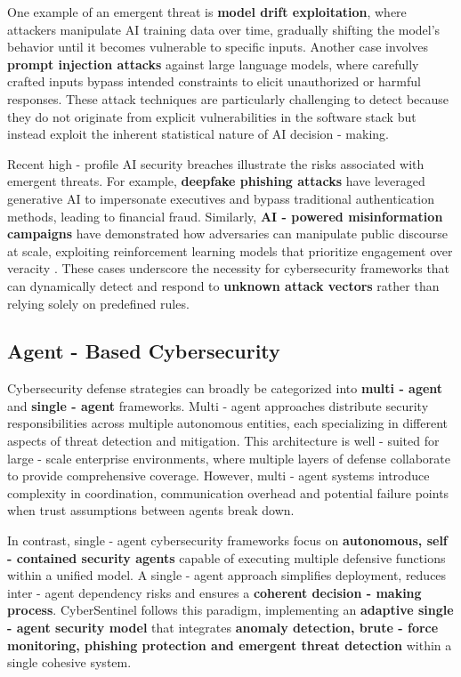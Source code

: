 One example of an emergent threat is \textbf{model drift exploitation}, where attackers manipulate AI training data over time, gradually shifting the model’s behavior until it becomes vulnerable to specific inputs. Another case involves \textbf{prompt injection attacks} against large language models, where carefully crafted inputs bypass intended constraints to elicit unauthorized or harmful responses. These attack techniques are particularly challenging to detect because they do not originate from explicit vulnerabilities in the software stack but instead exploit the inherent statistical nature of AI decision - making.

Recent high - profile AI security breaches illustrate the risks associated with emergent threats. For example, \textbf{deepfake phishing attacks} have leveraged generative AI to impersonate executives and bypass traditional authentication methods, leading to financial fraud. Similarly, \textbf{AI - powered misinformation campaigns} have demonstrated how adversaries can manipulate public discourse at scale, exploiting reinforcement learning models that prioritize engagement over veracity \cite{sharif2016accessorize}. These cases underscore the necessity for cybersecurity frameworks that can dynamically detect and respond to \textbf{unknown attack vectors} rather than relying solely on predefined rules.

\subsection{Agent - Based Cybersecurity}
Cybersecurity defense strategies can broadly be categorized into \textbf{multi - agent} and \textbf{single - agent} frameworks. Multi - agent approaches distribute security responsibilities across multiple autonomous entities, each specializing in different aspects of threat detection and mitigation. This architecture is well - suited for large - scale enterprise environments, where multiple layers of defense collaborate to provide comprehensive coverage. However, multi - agent systems introduce complexity in coordination, communication overhead and potential failure points when trust assumptions between agents break down.

In contrast, single - agent cybersecurity frameworks focus on \textbf{autonomous, self - contained security agents} capable of executing multiple defensive functions within a unified model. A single - agent approach simplifies deployment, reduces inter - agent dependency risks and ensures a \textbf{coherent decision - making process}. CyberSentinel follows this paradigm, implementing an \textbf{adaptive single - agent security model} that integrates \textbf{anomaly detection, brute - force monitoring, phishing protection and emergent threat detection} within a single cohesive system.

